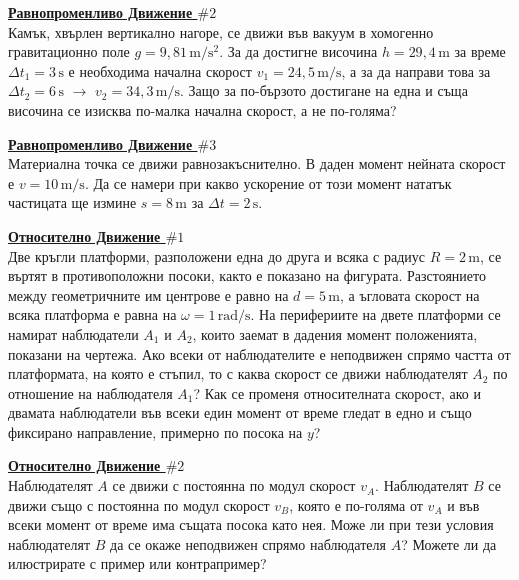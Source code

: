 \documentclass[a4paper]{article}
\begin{document}
	\ProblemBG %
	\textbf{\underline{Равнопроменливо Движение $\# 2$}}
	\vspace{0.2em}
	\\
	Камък, хвърлен вертикално нагоре, се движи във вакуум в хомогенно гравитационно поле $g = 9{,}81\,\mathrm{m/s^2}$. За да достигне височина $h = 29{,}4\,\mathrm{m}$ за време $\Delta t_1 = 3\,\mathrm{s}$ е необходима начална скорост $v_1 = 24{,}5\,\mathrm{m/s}$, а за да направи това за $\Delta t_2 = 6\,\mathrm{s}$ $\rightarrow$ $v_2 = 34{,}3\,\mathrm{m/s}$. Защо за по-бързото достигане на една и съща височина се изисква по-малка начална скорост, а не по-голяма?
	
	\ProblemBG %
	\textbf{\underline{Равнопроменливо Движение $\# 3$}}
	\vspace{0.2em}
	\\
	Материална точка се движи равнозакъснително. В даден момент нейната скорост е $v = 10\,\mathrm{m/s}$. Да се намери при какво ускорение от този момент нататък частицата ще измине $s = 8\,\mathrm{m}$ за $\Delta t = 2\,\mathrm{s}$.
	
	\ProblemBG %
	\textbf{\underline{Относително Движение $\# 1$}}
	\vspace{0.2em}
	\\
	Две кръгли платформи, разположени една до друга и всяка с радиус $R = 2\,\mathrm{m}$, се въртят в противоположни посоки, както е показано на фигурата. Разстоянието между геометричните им центрове е равно на $d = 5\,\mathrm{m}$, а ъгловата скорост на всяка платформа е равна на $\omega = 1\,\mathrm{rad/s}$. На перифериите на двете платформи се намират наблюдатели $A_1$ и $A_2$, които заемат в дадения момент положенията, показани на чертежа. Ако всеки от наблюдателите е неподвижен спрямо частта от платформата, на която е стъпил, то с каква скорост се движи наблюдателят $A_2$ по отношение на наблюдателя $A_1$? Как се променя относителната скорост, ако и двамата наблюдатели във всеки един момент от време гледат в едно и също фиксирано направление, примерно по посока на $y$?
	\begin{figure}[H]
		\centering
		
	\end{figure}
	
	\ProblemBG %
	\textbf{\underline{Относително Движение $\# 2$}}
	\vspace{0.2em}
	\\
	Наблюдателят $A$ се движи с постоянна по модул скорост $v_A$. Наблюдателят $B$ се движи също с постоянна по модул скорост $v_B$, която е по-голяма от $v_A$ и във всеки момент от време има същата посока като нея. Може ли при тези условия наблюдателят $B$ да се окаже неподвижен спрямо наблюдателя $A$? Можете ли да илюстрирате с пример или контрапример?
	
\end{document}
